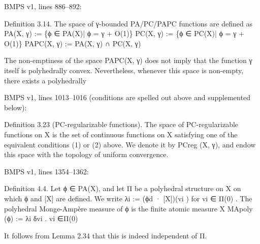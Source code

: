 \documentclass[
  11pt,
]{article}
\newenvironment{Shaded}{}{}
\newcommand{\NormalTok}[1]{#1}
\begin{document}
BMPS v1, lines 886--892:

\begin{Shaded}
\begin{Highlighting}[]
\NormalTok{Definition 3.14. The space of γ{-}bounded PA/PC/PAPC functions are defined as}
\NormalTok{                              PA(X, γ) := \{ϕ ∈ PA(X)| ϕ = γ + O(1)\}}
\NormalTok{                              PC(X, γ) := \{ϕ ∈ PC(X)| ϕ = γ + O(1)\}}
\NormalTok{                              PAPC(X, γ) := PA(X, γ) ∩ PC(X, γ)}

\NormalTok{   The non{-}emptiness of the space PAPC(X, γ) does not imply that the function γ itself is}
\NormalTok{polyhedrally convex. Nevertheless, whenever this space is non{-}empty, there exists a polyhedrally}
\end{Highlighting}
\end{Shaded}

BMPS v1, lines 1013--1016 (conditions are spelled out above and
supplemented below):

\begin{Shaded}
\begin{Highlighting}[]
\NormalTok{Definition 3.23 (PC{-}regularizable functions). The space of PC{-}regularizable functions on X}
\NormalTok{is the set of continuous functions on X satisfying one of the equivalent conditions (1) or (2) above.}
\NormalTok{We denote it by PCreg (X, γ), and endow this space with the topology of uniform convergence.}
\end{Highlighting}
\end{Shaded}

BMPS v1, lines 1354--1362:

\begin{Shaded}
\begin{Highlighting}[]
\NormalTok{Definition 4.4. Let ϕ ∈ PA(X), and let Π be a polyhedral structure on X on which ϕ and [X] are}
\NormalTok{defined. We write}
\NormalTok{                                      λi := (ϕd · [X])(vi )}
\NormalTok{for vi ∈ Π(0) . The polyhedral Monge{-}Ampère measure of ϕ is the finite atomic measure}
\NormalTok{                                                   X}
\NormalTok{                                   MApoly (ϕ) :=        λi δvi .}
\NormalTok{                                                    vi ∈Π(0)}

\NormalTok{   It follows from Lemma 2.34 that this is indeed independent of Π.}
\end{Highlighting}
\end{Shaded}
\end{document}
